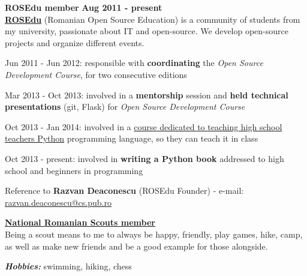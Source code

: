 \documentclass[margin,line]{resume}
\begin{document}
\begin{resume}
    \vspace{1.2mm}\textbf{ROSEdu member} \hfill \textbf{Aug 2011 - present} \vspace{1.5mm}\\
	\href{http://rosedu.org/}{\textbf{ROSEdu}} (Romanian Open Source Education) is a community of
	students from my university, passionate about IT and open-source. We develop
	open-source projects and organize different events.\vspace{1mm}
	\begin{list2}
        \item Jun 2011 - Jun 2012: responsible with \textbf{coordinating} the \textit{Open Source Development Course}, for two consecutive editions
        \item Mar 2013 - Oct 2013: involved in a \textbf{mentorship} session and \textbf{held technical presentations} (git, Flask) for \textit{Open Source Development Course}
        \item Oct 2013 - Jan 2014: involved in a \href{http://py4school.rosedu.org/}{course dedicated to teaching high school teachers Python} programming language, so they can teach it in class
        \item Oct 2013 - present: involved in \textbf{writing a Python book} addressed to high school and beginners in programming
	\end{list2}\vspace{-3mm}
	\small{Reference to \textbf{Razvan Deaconescu} (ROSEdu Founder)
		- e-mail: \href{mailto:razvan.deaconescu@cs.pub.ro}{razvan.deaconescu@cs.pub.ro}}

	\href{http://www.scoutpanaitescu.ro/}{\textbf{National Romanian Scouts member}}\vspace{1mm}\\
	Being a scout means to me to always be happy, friendly, play games, hike, camp, as well as make new friends and be a good example for those alongside.

	\textbf{\textit{Hobbies:}} swimming, hiking, chess



\end{resume}
\end{document}
